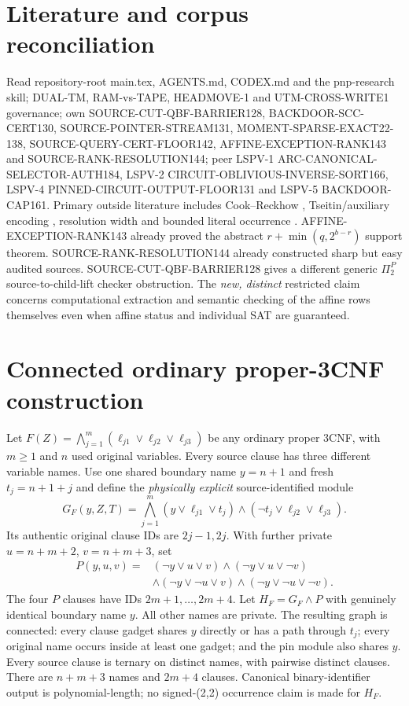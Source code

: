 \documentclass[11pt]{article}
\begin{document}
\section{Literature and corpus reconciliation}
Read repository-root main.tex, AGENTS.md, CODEX.md and the
pnp-research skill; DUAL-TM, RAM-vs-TAPE, HEADMOVE-1 and
UTM-CROSS-WRITE1 governance; own SOURCE-CUT-QBF-BARRIER128,
BACKDOOR-SCC-CERT130, SOURCE-POINTER-STREAM131,
MOMENT-SPARSE-EXACT22-138, SOURCE-QUERY-CERT-FLOOR142,
AFFINE-EXCEPTION-RANK143 and SOURCE-RANK-RESOLUTION144;
peer LSPV-1 ARC-CANONICAL-SELECTOR-AUTH184, LSPV-2
CIRCUIT-OBLIVIOUS-INVERSE-SORT166, LSPV-4
PINNED-CIRCUIT-OUTPUT-FLOOR131 and LSPV-5 BACKDOOR-CAP161.
Primary outside literature includes Cook--Reckhow \cite{CR},
Tseitin/auxiliary encoding \cite{UW}, resolution width \cite{BSW}
and bounded literal occurrence \cite{ZPS}.
AFFINE-EXCEPTION-RANK143 already proved the abstract
$r+\min(q,2^{b-r})$ support theorem. SOURCE-RANK-RESOLUTION144
already constructed sharp but easy audited sources.
SOURCE-CUT-QBF-BARRIER128 gives a different generic
$\Pi_2^P$ source-to-child-lift checker obstruction.
The \emph{new, distinct} restricted claim concerns computational
extraction and semantic checking of the affine rows themselves
even when affine status and individual SAT are guaranteed.

\section{Connected ordinary proper-3CNF construction}
Let $F(Z)=\bigwedge_{j=1}^m
(\ell_{j1}\vee\ell_{j2}\vee\ell_{j3})$ be any ordinary
proper 3CNF, with $m\ge1$ and $n$ used original variables.
Every source clause has three different variable names.
Use one shared boundary name $y=n+1$ and fresh
$t_j=n+1+j$ and define the \emph{physically explicit}
source-identified module
\begin{equation}
G_F(y,Z,T)=\bigwedge_{j=1}^{m}
 (y\vee\ell_{j1}\vee t_j)\wedge
 (\neg t_j\vee\ell_{j2}\vee\ell_{j3}).
\tag{1}
\end{equation}
Its authentic original clause IDs are $2j-1,2j$.
With further private $u=n+m+2$, $v=n+m+3$, set
\begin{align}
P(y,u,v)={}&(\neg y\vee u\vee v)
\wedge(\neg y\vee u\vee\neg v)\nonumber\\
&\wedge(\neg y\vee\neg u\vee v)
\wedge(\neg y\vee\neg u\vee\neg v).\tag{2}
\end{align}
The four $P$ clauses have IDs $2m+1,\ldots,2m+4$.
Let $H_F=G_F\wedge P$ with genuinely identical
boundary name $y$. All other names are private.
The resulting graph is connected: every clause gadget
shares $y$ directly or has a path through $t_j$; every
original name occurs inside at least one gadget; and
the pin module also shares $y$. Every source clause is
ternary on distinct names, with pairwise distinct
clauses. There are $n+m+3$ names and $2m+4$ clauses.
Canonical binary-identifier output is polynomial-length;
no signed-(2,2) occurrence claim is made for $H_F$.
\end{document}

